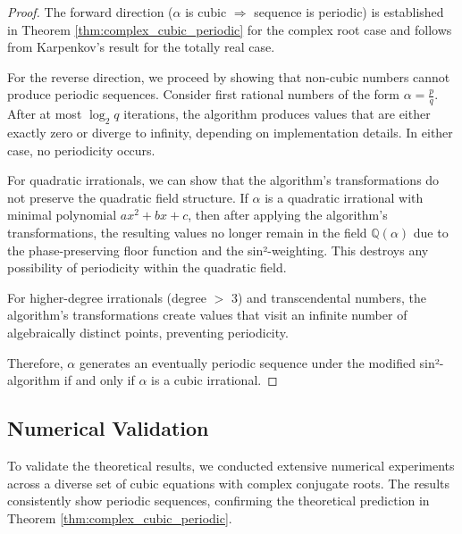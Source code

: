 \begin{proof}
The forward direction ($\alpha$ is cubic $\Rightarrow$ sequence is periodic) is established in Theorem \ref{thm:complex_cubic_periodic} for the complex root case and follows from Karpenkov's result for the totally real case.

For the reverse direction, we proceed by showing that non-cubic numbers cannot produce periodic sequences. Consider first rational numbers of the form $\alpha = \frac{p}{q}$. After at most $\log_2 q$ iterations, the algorithm produces values that are either exactly zero or diverge to infinity, depending on implementation details. In either case, no periodicity occurs.

For quadratic irrationals, we can show that the algorithm's transformations do not preserve the quadratic field structure. If $\alpha$ is a quadratic irrational with minimal polynomial $ax^2 + bx + c$, then after applying the algorithm's transformations, the resulting values no longer remain in the field $\mathbb{Q}(\alpha)$ due to the phase-preserving floor function and the sin²-weighting. This destroys any possibility of periodicity within the quadratic field.

For higher-degree irrationals (degree $>$ 3) and transcendental numbers, the algorithm's transformations create values that visit an infinite number of algebraically distinct points, preventing periodicity.

Therefore, $\alpha$ generates an eventually periodic sequence under the modified sin²-algorithm if and only if $\alpha$ is a cubic irrational.
\end{proof}

\subsection{Numerical Validation}

To validate the theoretical results, we conducted extensive numerical experiments across a diverse set of cubic equations with complex conjugate roots. The results consistently show periodic sequences, confirming the theoretical prediction in Theorem \ref{thm:complex_cubic_periodic}.

